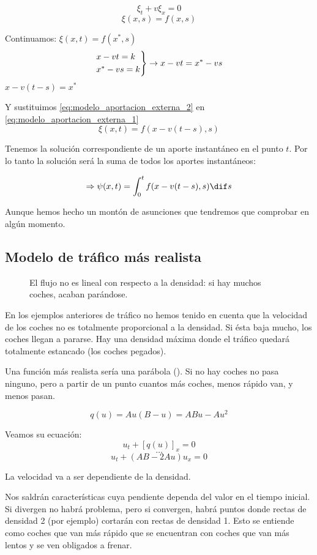 			$$\xi_t + v\xi_x = 0$$
			$$\xi(x,s) = f(x,s)$$

			Continuamos:
			\(\xi(x,t) = f(x^*,s) \label{eq:modelo_aportacion_externa_1}\)
			$$
			\begin{rcases}
				x-vt = k \\
				x^* - vs = k
			\end{rcases}
			 \rightarrow x-vt = x^* - vs
			$$
			\( x-v(t-s) = x^{*} \label{eq:modelo_aportacion_externa_2} \)

			Y sustituimos \ref{eq:modelo_aportacion_externa_2} en \ref{eq:modelo_aportacion_externa_1}
			$$\xi(x,t) = f(x - v(t-s), s)$$


			Tenemos la solución correspondiente de un aporte instantáneo en el punto $t$. Por lo tanto la solución será la suma de todos los aportes instantáneos:

			$$\Rightarrow \psi(x,t) = \int^{t}_{0} f(x-v(t-s),s) \dif s $$

			Aunque hemos hecho un montón de asunciones que tendremos que comprobar en algún momento.

	\subsection{Modelo de tráfico más realista}

		\begin{wrapfigure}{r}{0.4\textwidth}
			\centering
			\caption{El flujo no es lineal con respecto a la densidad: si hay muchos coches, acaban parándose.}
			\label{fig:parabola}
		\end{wrapfigure}

		En los ejemplos anteriores de tráfico no hemos tenido en cuenta que la velocidad de los coches no es totalmente proporcional a la densidad. Si ésta baja mucho, los coches llegan a pararse. Hay una densidad máxima donde el tráfico quedará totalmente estancado (los coches pegados).

		Una función más realista sería una parábola (). Si no hay coches no pasa ninguno, pero a partir de un punto cuantos más coches, menos rápido van, y menos pasan.

		$$ q(u) = Au (B-u) = ABu - Au^{2} $$

		Veamos su ecuación:
		$$u_t + [q(u)]_x = 0$$
		$$ … $$
		$$ u_t + (AB - 2Au) u_x = 0 $$

		La velocidad va a ser dependiente de la densidad.

		Nos saldrán características cuya pendiente dependa del valor en el tiempo inicial. Si divergen no habrá problema, pero si convergen, habrá puntos donde rectas de densidad 2 (por ejemplo) cortarán con rectas de densidad 1. Esto se entiende como coches que van más rápido que se encuentran con coches que van más lentos y se ven obligados a frenar.


